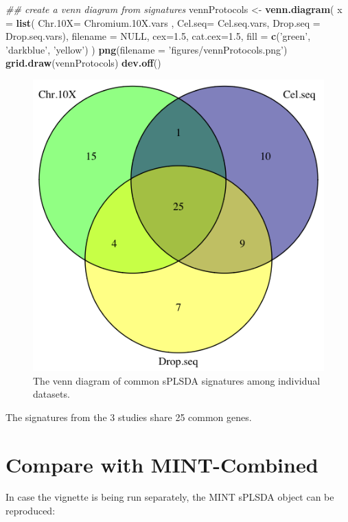 \documentclass[]{book}
\newenvironment{Shaded}{\begin{snugshade}}{\end{snugshade}}
\newcommand{\CommentTok}[1]{\textcolor[rgb]{0.56,0.35,0.01}{\textit{#1}}}
\newcommand{\DataTypeTok}[1]{\textcolor[rgb]{0.13,0.29,0.53}{#1}}
\newcommand{\FloatTok}[1]{\textcolor[rgb]{0.00,0.00,0.81}{#1}}
\newcommand{\KeywordTok}[1]{\textcolor[rgb]{0.13,0.29,0.53}{\textbf{#1}}}
\newcommand{\NormalTok}[1]{#1}
\newcommand{\OtherTok}[1]{\textcolor[rgb]{0.56,0.35,0.01}{#1}}
\newcommand{\StringTok}[1]{\textcolor[rgb]{0.31,0.60,0.02}{#1}}
\theoremstyle{definition}
\theoremstyle{definition}
\theoremstyle{definition}
\theoremstyle{remark}
\begin{document}
\begin{Shaded}
\begin{Highlighting}[]
\CommentTok{## create a venn diagram from signatures}
\NormalTok{vennProtocols <-}\StringTok{ }\KeywordTok{venn.diagram}\NormalTok{(}
    \DataTypeTok{x =} \KeywordTok{list}\NormalTok{(}
        \DataTypeTok{Chr.10X=}\NormalTok{ Chromium}\FloatTok{.10}\NormalTok{X.vars ,}
        \DataTypeTok{Cel.seq=}\NormalTok{ Cel.seq.vars,}
        \DataTypeTok{Drop.seq =}\NormalTok{ Drop.seq.vars),}
    \DataTypeTok{filename =} \OtherTok{NULL}\NormalTok{,}
    \DataTypeTok{cex=}\FloatTok{1.5}\NormalTok{, }\DataTypeTok{cat.cex=}\FloatTok{1.5}\NormalTok{,}
    \DataTypeTok{fill =} \KeywordTok{c}\NormalTok{(}\StringTok{'green'}\NormalTok{, }\StringTok{'darkblue'}\NormalTok{,  }\StringTok{'yellow'}\NormalTok{)}
\NormalTok{    )}
\KeywordTok{png}\NormalTok{(}\DataTypeTok{filename =} \StringTok{'figures/vennProtocols.png'}\NormalTok{)}
\KeywordTok{grid.draw}\NormalTok{(vennProtocols)}
\KeywordTok{dev.off}\NormalTok{()}
\end{Highlighting}
\end{Shaded}

\begin{figure}[ht]

{\centering \includegraphics[width=0.35\linewidth]{figures/vennProtocols} 

}

\caption{ The venn diagram of common sPLSDA signatures among individual datasets.}\label{fig:2-vennProtocolsShow}
\end{figure}

The signatures from the 3 studies share 25 common genes.

\hypertarget{compare-with-mint-combined}{%
\section{Compare with MINT-Combined}\label{compare-with-mint-combined}}

In case the vignette is being run separately, the MINT sPLSDA object can
be reproduced:
\end{document}
